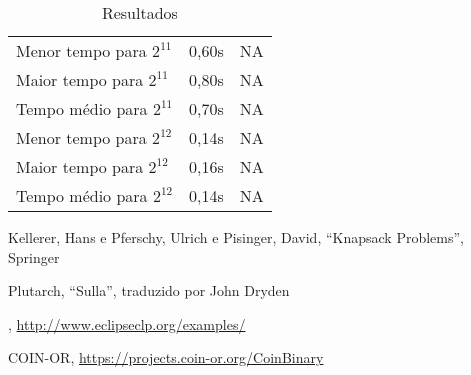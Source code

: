 \begin{center}
\begin{table}
\begin{tabular}{| l | c | c |}
      Menor tempo para $2^{11}$ & 0,60s & NA \\ Maior tempo para
      $2^{11}$ & 0,80s & NA \\ Tempo médio para $2^{11}$ & 0,70s & NA
      \\ \hline

      Menor tempo para $2^{12}$ & 0,14s & NA \\ Maior tempo para
      $2^{12}$ & 0,16s & NA \\ Tempo médio para $2^{12}$ & 0,14s & NA
      \\ \hline
    \end{tabular}
    \caption{Resultados}
    \label{tab:rst}
  \end{table}
  \egroup
\end{center}


\begin{thebibliography}{2}

 Kellerer, Hans e Pferschy, Ulrich e Pisinger,
  David, ``Knapsack Problems'', Springer

 Plutarch, ``Sulla'', traduzido por John Dryden

 \eclipse,
  \url{http://www.eclipseclp.org/examples/}

  COIN-OR,
  \url{https://projects.coin-or.org/CoinBinary}
  
\end{thebibliography}

%

